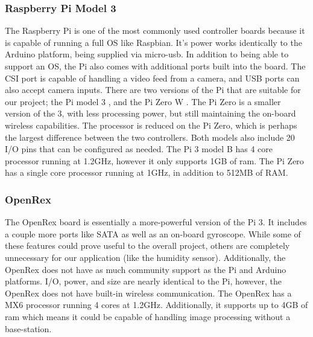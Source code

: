 \documentclass[letterpaper, 10, draftclsnofoot, onecolumn, compsoc]{IEEEtran}
\begin{document}

\subsubsection{Raspberry Pi Model 3}

The Raspberry Pi is one of the most commonly used controller boards 
because it is capable of running a full OS like Raspbian. It's 
power works identically to the Arduino platform, being supplied via 
micro-usb. In addition to being able to support an OS, the Pi also 
comes with additional ports built into the board. The CSI port is 
capable of handling a video feed from a camera, and USB ports can 
also accept camera inputs. There are two versions of the Pi that 
are suitable for our project; the Pi model 3 \cite{r2}, and 
the Pi Zero W \cite{r3}. The Pi Zero is a smaller version of the 3, 
with less processing power, but still maintaining the on-board 
wireless capabilities. 
The processor is reduced on the Pi Zero, which is perhaps the 
largest difference between the two controllers. Both models also 
include 20 I/O pins that can be configured as needed. The Pi 3 
model B has 4 core processor running at 1.2GHz, however it only 
supports 1GB of ram. The Pi Zero has a single core processor 
running at 1GHz, in addition to 512MB of RAM.   




\subsubsection{OpenRex}


The OpenRex\cite{r4} board is essentially a more-powerful version 
of the Pi 3. It includes a couple more ports like SATA as well as 
an on-board gyroscope. 
While some of these features could prove useful to the 
overall project, others are completely unnecessary for our 
application (like the humidity sensor). Additionally, the OpenRex 
does not have as much community support as the Pi and Arduino 
platforms. I/O, power, and size are nearly identical to the Pi, 
however, the OpenRex does not have built-in wireless communication. 
The OpenRex has a MX6 processor running 4 cores at 1.2GHz. 
Additionally, it supports up to 4GB of ram which means it could be 
capable of handling image processing without a base-station.  
\end{document}

